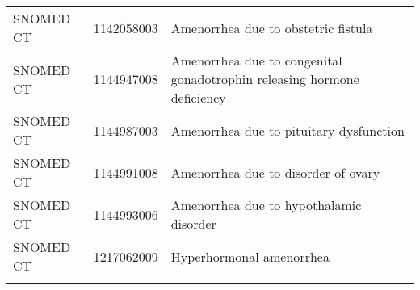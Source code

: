 \begin{longtable}{p{}p{}p{}}
  SNOMED CT & 1142058003 & Amenorrhea due to obstetric fistula \\ 
  SNOMED CT & 1144947008 & Amenorrhea due to congenital gonadotrophin releasing hormone deficiency \\ 
  SNOMED CT & 1144987003 & Amenorrhea due to pituitary dysfunction \\ 
  SNOMED CT & 1144991008 & Amenorrhea due to disorder of ovary \\ 
  SNOMED CT & 1144993006 & Amenorrhea due to hypothalamic disorder \\ 
  SNOMED CT & 1217062009 & Hyperhormonal amenorrhea \\ 
  \hline
\label{tab:codes_menstrual_irregularities}
\end{longtable}
